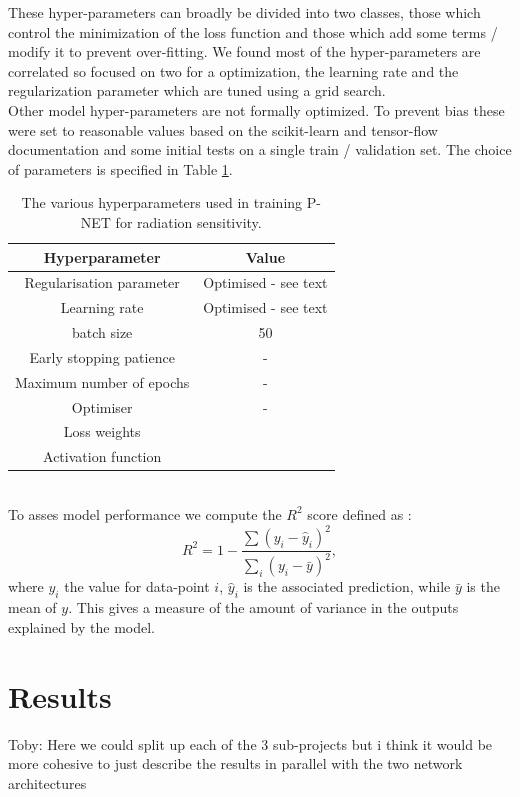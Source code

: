 \documentclass[NOTE, disdraft=true, UKenglish]{\DISCDTLATEXPATH UCLCDTDISdoc}
\begin{document}
These hyper-parameters can broadly be divided into two classes, those which control the minimization of the loss function and those which add some terms / modify it to prevent over-fitting. We found most of the hyper-parameters are correlated so focused on two for a optimization, the learning rate and the regularization parameter which are tuned using a grid search.  
\\ \indent Other model hyper-parameters are not formally optimized. To prevent bias these were set to reasonable values based on the scikit-learn and tensor-flow documentation and some initial tests on a single train / validation set. 
The choice of parameters is specified in Table \ref{tab:hyperpars}.
\begin{table}[]
    \centering
    \begin{tabular}{c|c}
       Hyperparameter  &  Value \\ \hline
       Regularisation parameter & Optimised - see text \\
       Learning rate  & Optimised - see text \\
      batch size  & 50 \\
      Early stopping patience &  - \\
     Maximum number of epochs &  - \\
     Optimiser &   - \\
     Loss weights &  \\
     Activation function & \\
    \end{tabular}
    \caption{The various hyperparameters used in training P-NET for radiation sensitivity.}
    \label{tab:hyperpars}
\end{table}
\\ \indent To asses model performance we compute the $R^2$ score defined as \cite{scikit-learn-docs}:
\begin{equation}
    R^2 = 1-\frac{\sum (y_i - \hat{y}_i)^2}{\sum_i (y_i - \bar{y})^2},
\end{equation}
where $y_i$ the value for data-point $i$, $\hat{y}_i$ is the associated prediction, while $\bar{y}$ is the mean of $y$. This gives a measure of the amount of variance in the outputs explained by the model.
%



\section{Results}
\label{sec:results}
{\color{red}Toby: Here we could split up each of the 3 sub-projects but i think it would be more cohesive to just describe the results in parallel with the two network architectures}
\\
\end{document}
